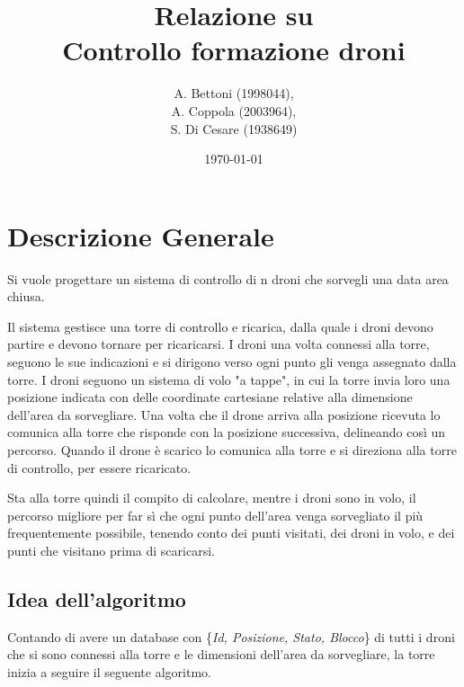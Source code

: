 \documentclass[a4paper, 12pt]{report}
\title{Relazione su \\
Controllo formazione droni}
\author{A. Bettoni (1998044),\\ A. Coppola (2003964),\\S. Di Cesare (1938649)}
\date{\today}
\begin{document}
\maketitle
\newpage
\tableofcontents
\newpage
\chapter{Descrizione Generale}
Si vuole progettare un sistema di controllo di n droni che sorvegli una data area chiusa.

Il sistema gestisce una torre di controllo e ricarica, dalla quale i droni devono partire e devono tornare per ricaricarsi. 
I droni una volta connessi alla torre, seguono le sue indicazioni e si dirigono verso ogni punto gli venga assegnato dalla torre.
I droni seguono un sistema di volo "a tappe", in cui la torre invia loro una posizione indicata con delle coordinate cartesiane
relative alla dimensione dell'area da sorvegliare. Una volta che il drone arriva alla posizione ricevuta lo comunica alla torre che risponde con la posizione successiva, delineando così un percorso.
Quando il drone è scarico lo comunica alla torre e si direziona alla torre di controllo, per essere ricaricato.

Sta alla torre quindi il compito di calcolare, mentre i droni sono in volo, il percorso migliore per far sì che ogni punto dell'area venga sorvegliato 
il più frequentemente possibile, tenendo conto dei punti visitati, dei droni in volo, e dei punti che visitano prima di scaricarsi.

\section{Idea dell'algoritmo}
Contando di avere un database con \{\textit{Id, Posizione, Stato, Blocco}\} di tutti i droni che si sono connessi alla torre e le dimensioni dell'area da sorvegliare, la torre inizia a seguire il seguente algoritmo.
\end{document}
